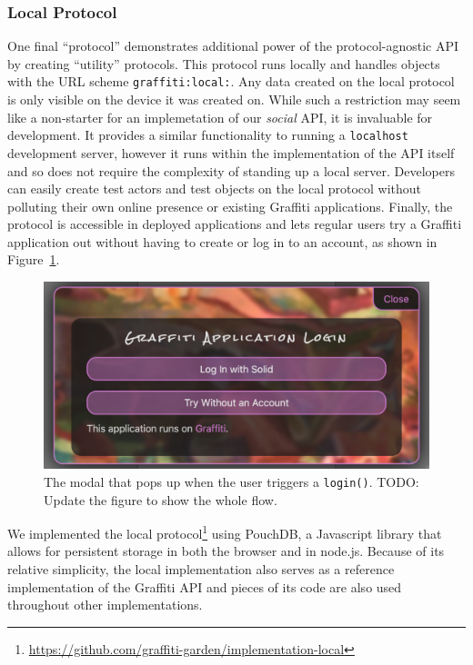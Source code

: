 \subsubsection{Local Protocol}

One final ``protocol'' demonstrates additional power of the protocol-agnostic
API by creating ``utility'' protocols.
This protocol runs locally
and handles objects with the URL scheme \texttt{graffiti:local:}.
Any data created on the local protocol is only visible on the device
it was created on.
While such a restriction may seem like a non-starter for an implemetation
of our \emph{social} API, it is invaluable for development.
It provides a similar functionality to running a \texttt{localhost} development server,
however it runs within the implementation of the API itself and so
does not require the complexity of standing up a local server.
Developers can easily create test actors and test objects on the local protocol
without polluting their own online presence or existing Graffiti applications.
Finally, the protocol is accessible in deployed applications
and lets regular users try a Graffiti application out without
having to create or log in to an account, as shown in
Figure~\ref{above-and-below:login}.

\begin{figure}
    \includegraphics[width=\columnwidth]{figures/login.png}
    \caption{The modal that pops up when the user triggers a \texttt{login()}. TODO: Update the figure to show the whole flow.}
    \label{above-and-below:login}
\end{figure}

We implemented the local protocol\footnote{
    \url{https://github.com/graffiti-garden/implementation-local}
} using PouchDB, a Javascript library that allows for persistent
storage in both the browser and in node.js.
Because of its relative simplicity, the local implementation also serves
as a reference implementation of the Graffiti API and pieces of its code are also used
throughout other implementations.

